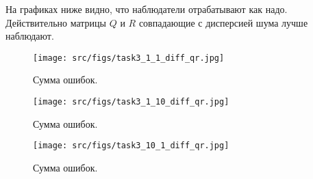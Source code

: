 На графиках ниже видно, что наблюдатели отрабатывают как надо. Действительно матрицы \(Q\) и \(R\) совпадающие с дисперсией шума лучше наблюдают.
\begin{figure}[ht!]
  \centering
  \texttt{[image: src/figs/task3\_1\_1\_diff\_qr.jpg]}
  \caption{Сумма ошибок.}
  \label{fig:task3_4}
\end{figure}
\begin{figure}[ht!]
        \centering
        \texttt{[image: src/figs/task3\_1\_10\_diff\_qr.jpg]}
        \caption{Сумма ошибок.}
        \label{fig:task3_5}
\end{figure}
\begin{figure}[ht!]
\centering
\texttt{[image: src/figs/task3\_10\_1\_diff\_qr.jpg]}
\caption{Сумма ошибок.}
\label{fig:task3_6}
\end{figure}

\FloatBarrier